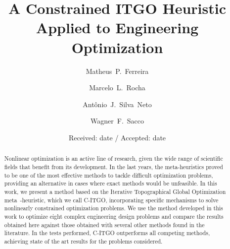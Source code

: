 
\title{A Constrained ITGO Heuristic Applied to Engineering Optimization}


\author{Matheus~P.~Ferreira     \and
        Marcelo~L.~Rocha         \and
        Ant\^onio~J.~Silva~Neto      \and
        Wagner~F.~Sacco
}







\date{Received: date / Accepted: date}

\maketitle

\begin{abstract}
    Nonlinear optimization is an active line of research, given the wide range of scientific fields that benefit from its development. In the last years, the meta-heuristics proved to be one of the most effective methods to tackle difficult optimization problems, providing an alternative in cases where exact methods would be unfeasible. In this work, we present a method based on the Iterative Topographical Global Optimization meta~-heuristic, which we call C-ITGO, incorporating specific mechanisms to solve nonlinearly constrained optimization problems. We use the method developed in this work to optimize eight complex engineering design problems and compare the results obtained here against those obtained with several other methods found in the literature. In the tests performed, C-ITGO outperforms all competing methods, achieving state of the art results for the problems considered.

\end{abstract}











